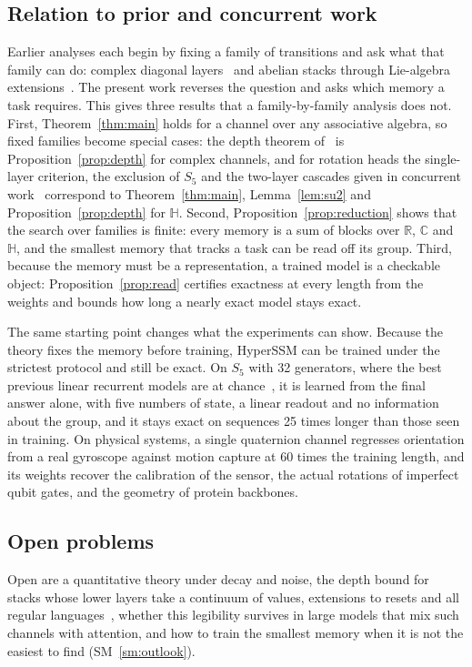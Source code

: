 \documentclass[aps,prx,reprint,superscriptaddress,longbibliography,nofootinbib,floatfix]{revtex4-2}
\newcommand{\HH}{\mathbb{H}}
\newcommand{\CC}{\mathbb{C}}
\newcommand{\RR}{\mathbb{R}}
\theoremstyle{plain}
\theoremstyle{definition}
\begin{document}
\subsection{Relation to prior and concurrent work}
Earlier analyses each begin by fixing a family of transitions and ask what
that family can do: complex diagonal layers~\cite{shakerinava} and abelian
stacks through Lie-algebra extensions~\cite{heo}. The present work reverses
the question and asks which memory a task requires. This gives three results
that a family-by-family analysis does not. First, Theorem~\ref{thm:main}
holds for a channel over any associative algebra, so fixed families become
special cases: the depth theorem of~\cite{shakerinava} is
Proposition~\ref{prop:depth} for complex channels, and for rotation heads
the single-layer criterion, the exclusion of $S_5$ and the two-layer cascades
given in concurrent work~\cite{jia_ncssm} correspond to
Theorem~\ref{thm:main}, Lemma~\ref{lem:su2} and Proposition~\ref{prop:depth}
for $\HH$. Second,
Proposition~\ref{prop:reduction} shows that the search over families is
finite: every memory is a sum of blocks over $\RR$, $\CC$ and $\HH$, and the
smallest memory that tracks a task can be read off its group. Third, because
the memory must be a representation, a trained model is a checkable object:
Proposition~\ref{prop:read} certifies exactness at every length from the
weights and bounds how long a nearly exact model stays exact.

The same starting point changes what the experiments can show. Because the
theory fixes the memory before training, HyperSSM can be trained under the
strictest protocol and still be exact. On $S_5$ with 32 generators, where the
best previous linear recurrent models are at chance~\cite{pdssm}, it is
learned from the final answer alone, with five numbers of state, a linear
readout and no information about the group, and it stays exact on sequences
25 times longer than those seen in training. On physical systems, a single
quaternion channel regresses orientation from a real gyroscope against motion
capture at 60 times the training length, and its weights recover the
calibration of the sensor, the actual rotations of imperfect qubit gates, and
the geometry of protein backbones.

\subsection{Open problems}
Open are a
quantitative theory under decay and noise, the depth bound for stacks whose
lower layers take a continuum of values, extensions to resets and all
regular languages~\cite{krohn_rhodes}, whether this legibility
survives in large models that mix such channels with attention, and how to
train the smallest memory when it is not the easiest to find
(SM~\ref{sm:outlook}).
\end{document}
